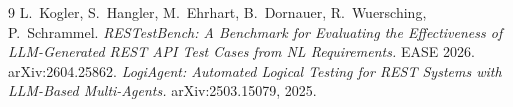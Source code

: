 \documentclass[11pt,a4paper]{article}
\begin{document}
\begin{thebibliography}{9}\small
\setlength{\itemsep}{1pt}
 L.~Kogler, S.~Hangler, M.~Ehrhart, B.~Dornauer, R.~Wuersching, P.~Schrammel. \emph{RESTestBench: A Benchmark for Evaluating the Effectiveness of LLM-Generated REST API Test Cases from NL Requirements.} EASE 2026. arXiv:2604.25862.
 \emph{LogiAgent: Automated Logical Testing for REST Systems with LLM-Based Multi-Agents.} arXiv:2503.15079, 2025.
\end{thebibliography}
\end{document}
